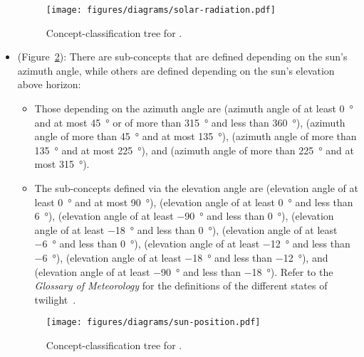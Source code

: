 \begin{itemize}
  \begin{figure}
    \centering
    \texttt{[image: figures/diagrams/solar-radiation.pdf]}
    \caption[Concept-classification tree for ]{Concept-classification tree for .}
    \label{fig:tree_solar_radiation}
  \end{figure}

  \item {} (Figure~\ref{fig:tree_sun_position}): There are sub-concepts that are defined depending on the sun's azimuth angle, while others are defined depending on the sun's elevation above horizon:
    \begin{itemize}
      \item Those depending on the azimuth angle are  (azimuth angle of at least \SI{0}{\degree} and at most \SI{45}{\degree} or of more than \SI{315}{\degree} and less than \SI{360}{\degree}),  (azimuth angle of more than \SI{45}{\degree} and at most \SI{135}{\degree}),  (azimuth angle of more than \SI{135}{\degree} and at most \SI{225}{\degree}), and  (azimuth angle of more than \SI{225}{\degree} and at most \SI{315}{\degree}).
      
      \item The sub-concepts defined via the elevation angle are  (elevation angle of at least \SI{0}{\degree} and at most \SI{90}{\degree}),  (elevation angle of at least \SI{0}{\degree} and less than \SI{6}{\degree}),  (elevation angle of at least \SI{-90}{\degree} and less than \SI{0}{\degree}),  (elevation angle of at least \SI{-18}{\degree} and less than \SI{0}{\degree}),  (elevation angle of at least \SI{-6}{\degree} and less than \SI{0}{\degree}),  (elevation angle of at least \SI{-12}{\degree} and less than \SI{-6}{\degree}),  (elevation angle of at least \SI{-18}{\degree} and less than \SI{-12}{\degree}), and  (elevation angle of at least \SI{-90}{\degree} and less than \SI{-18}{\degree}). Refer to the \emph{Glossary of Meteorology} for the definitions of the different states of twilight~\cite{GlossaryOfMeteorology}.
    \end{itemize}
  
  \begin{figure}
    \centering
    \texttt{[image: figures/diagrams/sun-position.pdf]}
    \caption[Concept-classification tree for ]{Concept-classification tree for .}
    \label{fig:tree_sun_position}
  \end{figure}


\end{itemize}

